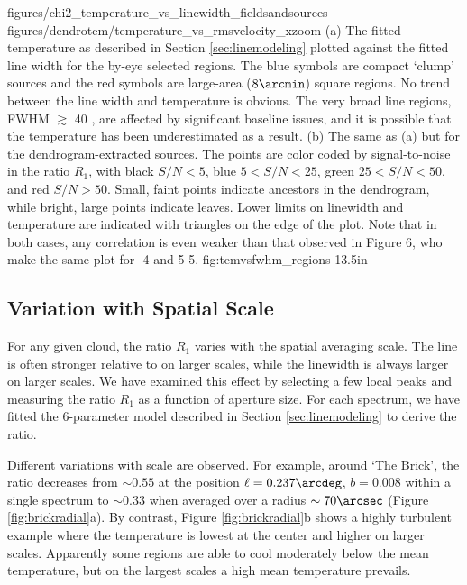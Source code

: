 \FigureTwo
{figures/chi2_temperature_vs_linewidth_fieldsandsources}
{figures/dendrotem/temperature_vs_rmsvelocity_xzoom} %
{(a) 
The fitted temperature as described in Section \ref{sec:linemodeling} plotted
against the fitted line width for the by-eye selected regions.  The blue
symbols are compact `clump' sources and the red symbols are large-area
($8\arcmin$) square regions.  No trend between the line width and temperature
is obvious.  The very broad line regions, FWHM $\gtrsim$ 40 \kms, are affected
by significant baseline issues, and it is possible that the temperature has been
underestimated as a result.
(b) The same as (a) but for the dendrogram-extracted sources. The points are
color coded by signal-to-noise in the ratio $R_1$, with black $S/N < 5$, blue
$5 < S/N < 25$, green $25 < S/N < 50$, and red $S/N > 50$.  Small, faint points
indicate ancestors in the dendrogram, while bright, large points indicate leaves.
Lower limits on linewidth and temperature are indicated with triangles on the
edge of the plot.  
Note that in both cases, any correlation is even weaker than that observed in
\citet{Huettemeister1993a} Figure 6, who make the same plot for -4
and 5-5.
}
{fig:temvsfwhm_regions}
{1}{3.5in}



\subsection{Variation with Spatial Scale}
For any given cloud, the ratio $R_1$ varies with the spatial averaging scale.
The \para \threeohthree line is often stronger relative to \threetwoone on
larger scales, while the linewidth is always larger on larger scales.  We have
examined this effect by selecting a few local \para \threeohthree peaks and
measuring the ratio $R_1$ as a function of aperture size.  For each spectrum,
we have fitted the 6-parameter model described in Section
\ref{sec:linemodeling} to derive the ratio.

Different variations with scale are observed.  For example, around `The Brick',
the ratio decreases from $\sim0.55$ at the position $\ell=0.237\arcdeg$, $b=0.008$
within a single spectrum to $\sim0.33$ when averaged over a radius
$\sim70\arcsec$ (Figure \ref{fig:brickradial}a).  By contrast, Figure
\ref{fig:brickradial}b shows a highly turbulent example where the temperature
is lowest at the center and higher on larger scales.  Apparently some regions
are able to cool moderately below the mean temperature, but on the largest
scales a high mean temperature prevails.

